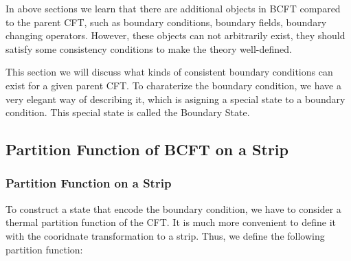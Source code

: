 In above sections we learn that there are additional objects in BCFT
compared to the parent CFT, such as boundary conditions, boundary
fields, boundary changing operators. However, these objects can not
arbitrarily exist, they should satisfy some consistency conditions to
make the theory well-defined.

This section we will discuss what kinds of consistent boundary
conditions can exist for a given parent CFT. To charaterize the
boundary condition, we have a very elegant way of describing it,
which is asigning a special state to a boundary condition. This
special state is called the Boundary State.

\subsection{Partition Function of BCFT on a Strip}

\subsubsection{Partition Function on a Strip}

To construct a state that encode the boundary condition, we have to
consider a thermal partition function of the CFT. It is much more
convenient to define it with the cooridnate transformation to a
strip. Thus, we define the following partition function:


